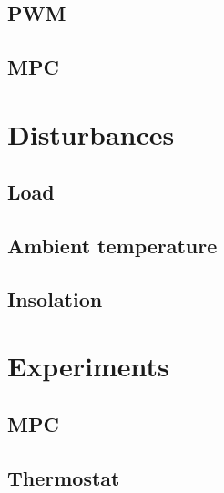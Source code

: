 \subsection{PWM}



\subsection{MPC}



\section{Disturbances}

\subsection{Load}



\subsection{Ambient temperature}



\subsection{Insolation}



\section{Experiments}

\subsection{MPC}



\subsection{Thermostat}


